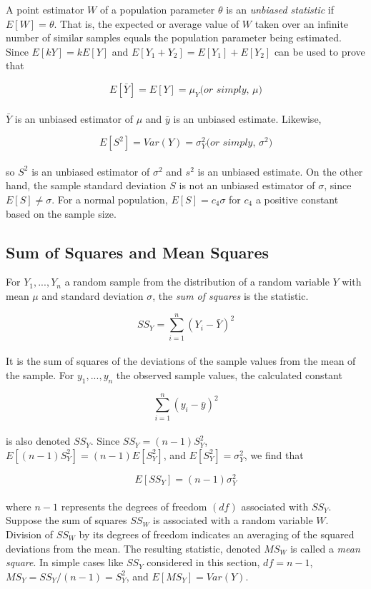 \documentclass{WileySev}
\begin{document}
A point estimator $W$ of a population parameter $\theta$ is an \textit{unbiased statistic} if $E[W] = \theta$. That is, the expected or average value of $W$ taken over an infinite number of similar samples equals the population parameter being estimated. Since $E[kY] = kE[Y]$ and $E[Y_1+Y_2]=E[Y_1]+E[Y_2]$ can be used to prove that

\begin{equation}
E[\bar{Y}]=E[Y]=\mu_Y  \textit{(or simply, $\mu$)}
\end{equation}
\\
$\bar{Y}$ is an unbiased estimator of $\mu$ and $\bar{y}$ is an unbiased estimate. Likewise,

\begin{equation}
E[S^2]=Var(Y)=\sigma_Y^2 \textit{(or simply, $\sigma^2$)}
\end{equation}
\\
so $S^2$ is an unbiased estimator of $\sigma^2$ and $s^2$ is an unbiased estimate. On the other hand, the sample standard deviation $S$ is not an unbiased estimator of $\sigma$, since $E[S]\neq \sigma$. For a normal population, $E[S] = c_4\sigma$ for $c_4$ a positive constant based on the sample size.

\subsection{Sum of Squares and Mean Squares}

For $Y_1,...,Y_n$ a random sample from the distribution of a random variable $Y$ with mean $\mu$ and standard deviation $\sigma$, the \textit{sum of squares} is the statistic.

\begin{equation}
SS_Y=\sum_{i=1}^n(Y_i-\bar{Y})^2
\end{equation}
\\
It is the sum of squares of the deviations of the sample values from the mean of the sample. For $y_1,...,y_n$ the observed sample values, the calculated constant

\begin{equation}
\sum_{i=1}^n(y_i-\bar{y})^2
\end{equation}
\\
is also denoted $SS_Y$. Since $SS_Y=(n-1)S_Y^2$, $E[(n-1)S_Y^2]=(n-1)E[S_Y^2]$, and $E[S_Y^2]=\sigma_Y^2$, we find that

\begin{equation}
E[SS_Y]=(n-1)\sigma_Y^2
\end{equation}
\\
where $n-1$ represents the degrees of freedom $(df)$ associated with $SS_Y$.
Suppose the sum of squares $SS_W$ is associated with a random variable $W$. Division of $SS_W$ by its degrees of freedom indicates an averaging of the squared deviations from the mean. The resulting statistic, denoted $MS_W$ is called a \textit{mean square}. In simple cases like $SS_Y$ considered in this section, $df=n-1$, $MS_Y=SS_Y/(n-1)=S_Y^2$, and $E[MS_Y]=Var(Y)$.
\end{document}
